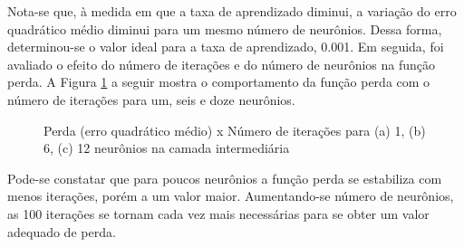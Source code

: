 \documentclass[brazil,tf,epusp]{usp}  %
\begin{document}
Nota-se que, à medida em que a taxa de aprendizado diminui, a variação do erro quadrático médio diminui para um mesmo número de neurônios. Dessa forma, determinou-se o valor ideal para a taxa de aprendizado, 0.001.
Em seguida, foi avaliado o efeito do número de iterações e do número de neurônios na função perda. A Figura \ref{fig:loss_NN} a seguir mostra o comportamento da função perda com o número de iterações para um, seis e doze neurônios.

\begin{figure}[!h]

\caption{Perda (erro quadrático médio) x Número de iterações para (a) 1, (b) 6, (c) 12 neurônios na camada intermediária}
\label{fig:loss_NN}
\end{figure}

Pode-se constatar que para poucos neurônios a função perda se estabiliza com menos iterações, porém a um valor maior. Aumentando-se número de neurônios, as 100 iterações se tornam cada vez mais necessárias para se obter um valor adequado de perda.
\end{document}
